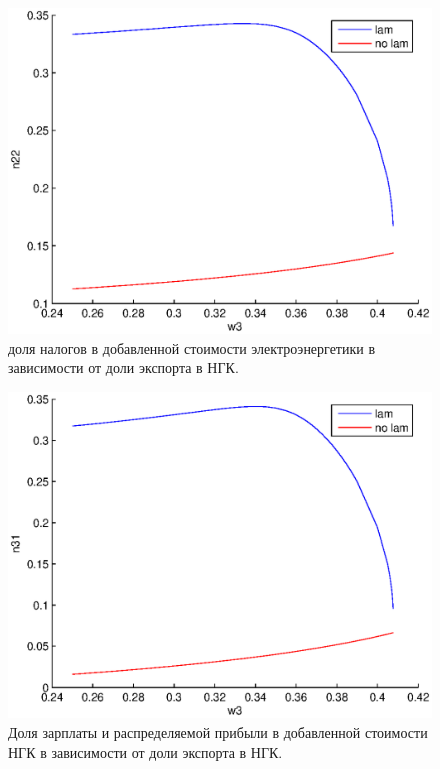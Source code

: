 \documentclass[12pt]{article}
\theoremstyle{rusdef}
\begin{document}
\begin{figure}[h!]
	\centering
	\includegraphics[scale=0.8]{pics/w3_n22.eps}
	\caption{доля налогов в добавленной стоимости электроэнергетики в зависимости от доли экспорта в НГК.}
\end{figure}
\begin{figure}[h!]
	\centering
	\includegraphics[scale=0.8]{pics/w3_n31.eps}
	\caption{Доля зарплаты и распределяемой прибыли в добавленной стоимости НГК в зависимости от доли экспорта в НГК.}
\end{figure}
\end{document}
